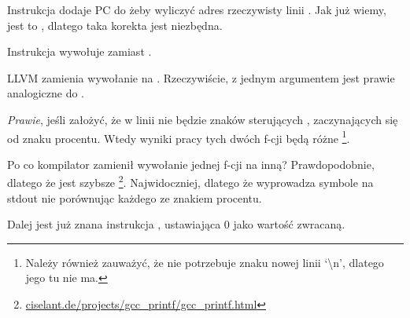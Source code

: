 Instrukcja  dodaje \ac{PC} do  żeby wyliczyć adres rzeczywisty linii . Jak już wiemy, jest to \q{\PICcode}, dlatego taka korekta jest niezbędna.

Instrukcja  wywołuje \puts zamiast \printf.

\label{puts}
LLVM zamienia wywołanie \printf na \puts. 
Rzeczywiście, \printf z jednym argumentem jest prawie analogiczne do \puts.
 
\emph{Prawie}, jeśli założyć, że w linii nie będzie znaków sterujących \printf, 
zaczynających się od znaku procentu. Wtedy wyniki pracy tych dwóch f-cji będą różne
\footnote{Należy również zauważyć, że \puts nie potrzebuje znaku nowej linii `\textbackslash{}n',
dlatego jego tu nie ma.}.

Po co kompilator zamienił wywołanie jednej f-cji na inną? Prawdopodobnie, dlatego że \puts jest szybsze
\footnote{\href{http://go.yurichev.com/17063}{ciselant.de/projects/gcc\_printf/gcc\_printf.html}}. 
Najwidoczniej, dlatego że \puts wyprowadza symbole na \gls{stdout} nie porównując każdego ze znakiem procentu.

Dalej jest już znana instrukcja , ustawiająca 0 jako wartość zwracaną.


